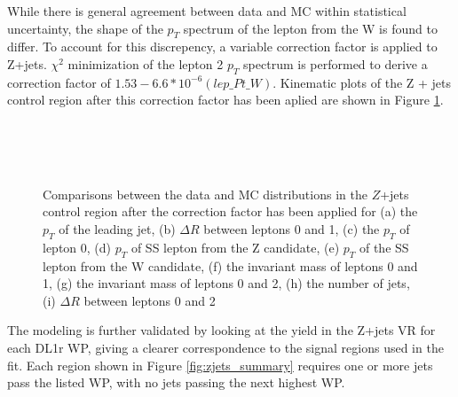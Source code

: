 While there is general agreement between data and MC within statistical uncertainty, the shape of the $p_T$ spectrum of the lepton from the W is found to differ. To account for this discrepency, a variable correction factor is applied to Z+jets. $\chi^2$ minimization of the lepton 2 $p_T$ spectrum is performed to derive a correction factor of $1.53 - 6.6*10^{-6} (lep\_Pt\_W)$. Kinematic plots of the Z + jets control region after this correction factor has been aplied are shown in Figure \ref{fig:zjets_withScale}.

\begin{figure}[H]
    \\
    \\                                 
    \\
    \caption{Comparisons between the data and MC distributions in the $Z$+jets control region after the correction factor has been applied for (a) the $p_T$ of the leading jet, (b) $\Delta R$ between leptons 0 and 1, (c) the $p_T$ of lepton 0, (d) $p_T$ of SS lepton from the Z candidate, (e) $p_T$ of the SS lepton from the W candidate, (f) the invariant mass of leptons 0 and 1, (g) the invariant mass of leptons 0 and 2, (h) the number of jets, (i) $\Delta R$ between leptons 0 and 2}%
    \label{fig:zjets_withScale}
\end{figure}

The modeling is further validated by looking at the yield in the Z+jets VR for each DL1r WP, giving a clearer correspondence to the signal regions used in the fit. Each region shown in Figure \ref{fig:zjets_summary} requires one or more jets pass the listed WP, with no jets passing the next highest WP.                                                                    

